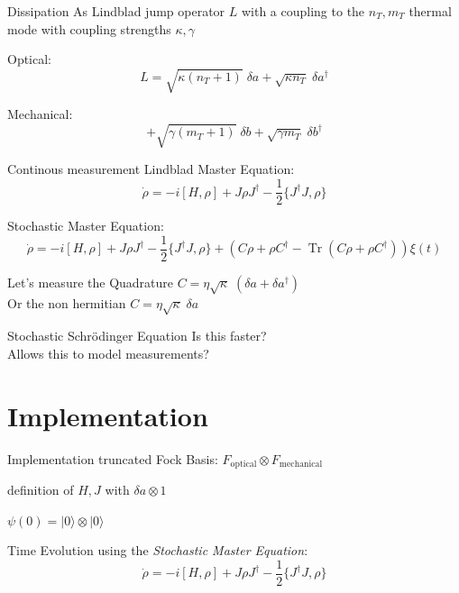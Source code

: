 \documentclass{beamer}
\DeclareMathOperator{\Tr}{Tr}
\begin{document}
\begin{frame}{Dissipation}
	As Lindblad jump operator $L$ with a coupling to the $n_T, m_T$ thermal mode with coupling strengths $\kappa, \gamma$

	Optical:
	$$L = \sqrt{\kappa (n_T+1)} \;\delta a 
		+ \sqrt{\kappa n_T} \; \delta a^\dagger$$
	
	Mechanical:
	$$
		+ \sqrt{\gamma (m_T+1)} \;\delta b 
		+ \sqrt{\gamma m_T} \; \delta b^\dagger
	$$
\end{frame}

\begin{frame}{Continous measurement}
	\textcolor{seegrau}{
		Lindblad Master Equation:
		$$\dot\rho = -i[H,\rho] + J\rho J^\dagger - \frac{1}{2} \{J^\dagger J, \rho\}$$
	}

	Stochastic Master Equation:
	$$
		\dot\rho 
		= -i[H,\rho] 
		+ J\rho J^\dagger - \frac{1}{2} \{J^\dagger J, \rho\} 
		+ \left(C\rho + \rho C^\dagger - \Tr(C\rho + \rho C^\dagger)\right)\xi(t)
	$$

	Let's measure the Quadrature $C = \eta\sqrt{\kappa}\;(\delta a + \delta a^\dagger)$\\
	Or the non hermitian $C = \eta \sqrt{\kappa}\; \delta a$

\end{frame}

\begin{frame}{Stochastic Schrödinger Equation}
	\centering
	Is this faster?\\
	Allows this to model measurements?
\end{frame}

\section{Implementation}
\begin{frame}{Implementation}
truncated Fock Basis: $F_\text{optical} \otimes F_\text{mechanical}$

definition of $H, J$ with $\delta a \otimes 1$

$\psi(0) = |0\rangle \otimes |0\rangle$

Time Evolution using the \emph{Stochastic Master Equation}: 
$$
	\dot\rho = -i[H,\rho] + J\rho J^\dagger - \frac{1}{2} \{J^\dagger J, \rho\}
$$
\end{frame}
\end{document}
